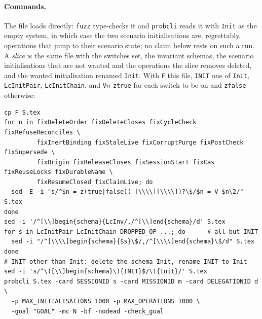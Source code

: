 \documentclass[a4paper,10pt,fleqn]{article}
\newcommand{\field}[1]{\texttt{#1}}
\begin{document}
\paragraph{Commands.} The file loads directly: \texttt{fuzz} type-checks it
and \texttt{probcli} reads it with \field{Init} as the empty system, in which
case the two scenario initialisations are, regrettably, operations that jump
to their scenario state; no claim below rests on such a run. A \emph{slice}
is the same file with the switches set, the invariant schemas, the scenario
initialisations that are not wanted and the operations the slice removes
deleted, and the wanted initialisation renamed \field{Init}. With
\texttt{F} this file, \texttt{INIT} one of \field{Init}, \field{LcInitPair},
\field{LcInitChain}, and \texttt{V$n$} \texttt{ztrue} for each switch to be on
and \texttt{zfalse} otherwise:

\begin{verbatim}
cp F S.tex
for n in fixDeleteOrder fixDeleteCloses fixCycleCheck fixRefuseReconciles \
         fixInertBinding fixStaleLive fixCorruptPurge fixPostCheck fixSupersede \
         fixOrigin fixReleaseCloses fixSessionStart fixCas fixReuseLocks fixDurableName \
         fixResumeClosed fixClaimLive; do
  sed -E -i "s/^$n = z(true|false)( [\\\\][\\\\])?\$/$n = V_$n\2/" S.tex
done
sed -i '/^[\\]begin{schema}{LcInv/,/^[\\]end{schema}/d' S.tex
for s in LcInitPair LcInitChain DROPPED_OP ...; do      # all but INIT
  sed -i "/^[\\\\]begin{schema}{$s}\$/,/^[\\\\]end{schema}\$/d" S.tex
done
# INIT other than Init: delete the schema Init, rename INIT to Init
sed -i 's/^\([\\]begin{schema}\){INIT}$/\1{Init}/' S.tex
probcli S.tex -card SESSIONID s -card MISSIONID m -card DELEGATIONID d \
  -p MAX_INITIALISATIONS 1000 -p MAX_OPERATIONS 1000 \
  -goal "GOAL" -mc N -bf -nodead -check_goal
\end{verbatim}
\end{document}
